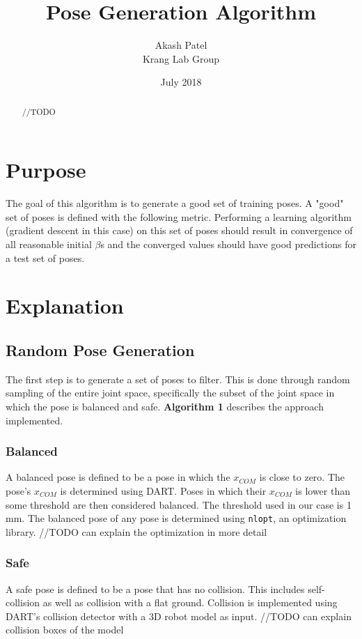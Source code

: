 \documentclass[letterpaper, 10pt, conference]{ieeeconf}
\title{Pose Generation Algorithm}
\author{Akash Patel\\ Krang Lab Group}
\date{July 2018}
\begin{document}
\maketitle
\thispagestyle{empty}
\pagestyle{empty}

\begin{abstract}

//TODO

\end{abstract}

\section{Purpose}

The goal of this algorithm is to generate a good set of training poses. A "good"
set of poses is defined with the following metric. Performing a learning
algorithm (gradient descent in this case) on this set of poses should result in
convergence of all reasonable initial $\beta$s and the converged values should
have good predictions for a test set of poses.

\section{Explanation}

\subsection{Random Pose Generation}

The first step is to generate a set of poses to filter. This is done through
random sampling of the entire joint space, specifically the subset of the joint
space in which the pose is balanced and safe. \textbf{Algorithm 1} describes the
approach implemented.

\subsubsection{Balanced}
A balanced pose is defined to be a pose in which the $x_{COM}$ is close to
zero. The pose's $x_{COM}$ is determined using DART. Poses in which their
$x_{COM}$ is lower than some threshold are then considered balanced. The
threshold used in our case is 1 mm. The balanced pose of any pose is determined
using \texttt{nlopt}, an optimization library. //TODO can explain the
optimization in more detail

\subsubsection{Safe}
A safe pose is defined to be a pose that has no collision. This includes
self-collision as well as collision with a flat ground. Collision is implemented
using DART's collision detector with a 3D robot model as input. //TODO can
explain collision boxes of the model
\end{document}
